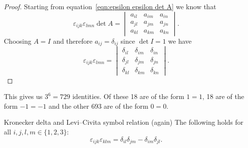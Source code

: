 \begin{proof}
    Starting from equation~\ref{eqn:epsilon epsilon det A} we know that
    \[
    \varepsilon_{ijk}\varepsilon_{lmn}\det A = 
    \begin{vmatrix}
        a_{il} & a_{im} & a_{in}\\
        a_{jl} & a_{jm} & a_{jn}\\
        a_{kl} & a_{km} & a_{kn}
    \end{vmatrix}
    .
    \]
    Choosing \(A = I\) and therefore \(a_{ij} = \delta_{ij}\) since \(\det I = 1\) we have
    \[
    \varepsilon_{ijk}\varepsilon_{lmn} =
    \begin{vmatrix}
        \delta_{il} & \delta_{im} & \delta_{in}\\
        \delta_{jl} & \delta_{jm} & \delta_{jn}\\
        \delta_{kl} & \delta_{km} & \delta_{kn}
    \end{vmatrix}
    .
    \]
\end{proof}
This gives us \(3^6 = 729\) identities.
Of these 18 are of the form \(1 = 1\), 18 are of the form \(-1 = -1\) and the other 693 are of the form \(0 = 0\).
\begin{corollary}{Kronecker delta and Levi--Civita symbol relation (again)}{}
    The following holds for all \(i, j, l, m \in \{1, 2, 3\}\):
    \[\varepsilon_{ijk}\varepsilon_{klm} = \delta_{il}\delta_{jm} - \delta_{im}\delta_{jl}.\]
\end{corollary}
